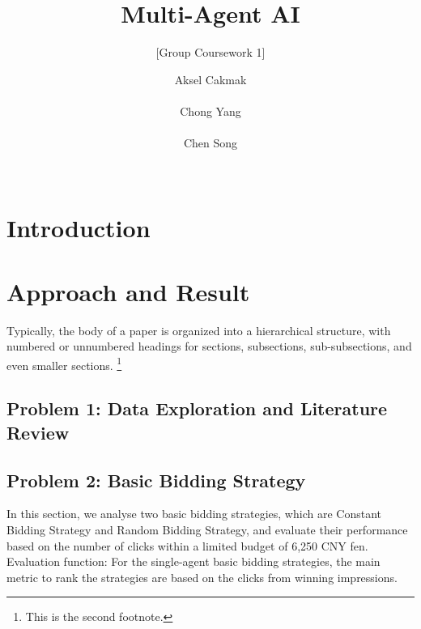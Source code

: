 \documentclass{sig-alternate-05-2015}
\begin{document}

\title{Multi-Agent AI}
\subtitle{[Group Coursework 1]}

\author{
\alignauthor
Aksel Cakmak\\
       \\
\alignauthor
Chong Yang\\
       \\
\alignauthor
Chen Song \\
       \\
}

\maketitle

\section{Introduction}


\section{Approach and Result}
Typically, the body of a paper is organized
into a hierarchical structure, with numbered or unnumbered
headings for sections, subsections, sub-subsections, and even
smaller sections.
\footnote{This is the second footnote.}

\subsection{Problem 1: Data Exploration and Literature Review}

\subsection{Problem 2: Basic Bidding Strategy}
In this section, we analyse two basic bidding strategies, which are Constant Bidding Strategy and Random Bidding Strategy, and evaluate their performance based on the number of clicks within a limited budget of 6,250 CNY fen. 
Evaluation function: For the single-agent basic bidding strategies, the main metric to rank the strategies are based on the clicks from winning impressions.
\end{document}
